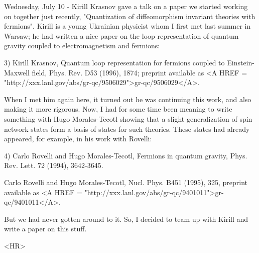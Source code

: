 Wednesday, July 10 - Kirill Krasnov gave a talk on a paper we started
working on together just recently, "Quantization of diffeomorphism
invariant theories with fermions".  Kirill is a young Ukrainian
physicist whom I first met last summer in Warsaw; he had written a
nice paper on the loop representation of quantum gravity coupled to
electromagnetism and fermions:

3) Kirill Krasnov, Quantum loop representation for fermions coupled
to Einstein-Maxwell field, Phys. Rev. D53 (1996), 1874; preprint
available as <A HREF = "http://xxx.lanl.gov/abs/gr-qc/9506029">gr-qc/9506029</A>.

When I met him again here, it turned out he was continuing this work,
and also making it more rigorous.  Now, I had for some time been
meaning to write something with Hugo Morales-Tecotl showing that a
slight generalization of spin network states form a basis of states
for such theories.  These states had already appeared, for example, in
his work with Rovelli:

4) Carlo Rovelli and Hugo Morales-Tecotl, Fermions in quantum 
gravity, Phys. Rev. Lett. 72 (1994), 3642-3645.

Carlo Rovelli and Hugo Morales-Tecotl, Nucl. Phys. B451 (1995), 325,
preprint available as <A HREF = "http://xxx.lanl.gov/abs/gr-qc/9401011">gr-qc/9401011</A>. 

But we had never gotten around to it.  So, I decided to team up with Kirill
and write a paper on this stuff.

<HR>



